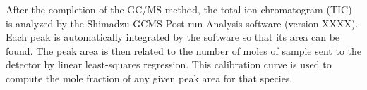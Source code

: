 \documentclass[../main.tex]{subfiles}
\begin{document}
After the completion of the GC/MS method, the total ion
chromatogram (TIC) is analyzed by the Shimadzu GCMS Post-run
Analysis software (version XXXX). Each peak is automatically
integrated by the software so that its area can be found.
The peak area is then related to the number of moles of
sample sent to the detector by linear least-squares regression.
This calibration curve is used to compute the mole fraction
of any given peak area for that species.
\end{document}
